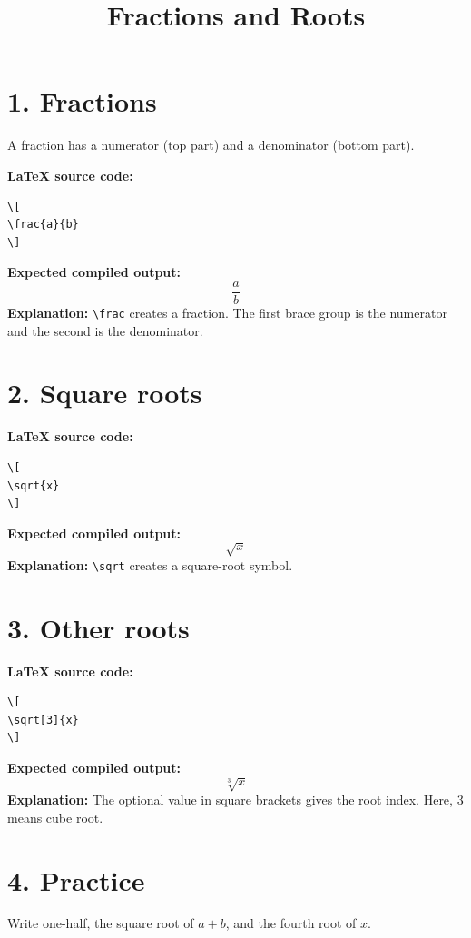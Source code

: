 \documentclass{article}
\title{Fractions and Roots}
\author{ }
\date{}
\begin{document}
\maketitle

\section*{1. Fractions}
A fraction has a numerator (top part) and a denominator (bottom part).

\textbf{LaTeX source code:}
\begin{verbatim}
\[
\frac{a}{b}
\]
\end{verbatim}
\textbf{Expected compiled output:}
\[
\frac{a}{b}
\]
\textbf{Explanation:} \verb|\frac| creates a fraction. The first brace group is the numerator and the second is the denominator.

\section*{2. Square roots}
\textbf{LaTeX source code:}
\begin{verbatim}
\[
\sqrt{x}
\]
\end{verbatim}
\textbf{Expected compiled output:}
\[
\sqrt{x}
\]
\textbf{Explanation:} \verb|\sqrt| creates a square-root symbol.

\section*{3. Other roots}
\textbf{LaTeX source code:}
\begin{verbatim}
\[
\sqrt[3]{x}
\]
\end{verbatim}
\textbf{Expected compiled output:}
\[
\sqrt[3]{x}
\]
\textbf{Explanation:} The optional value in square brackets gives the root index. Here, 3 means cube root.

\section*{4. Practice}
Write one-half, the square root of \(a+b\), and the fourth root of \(x\).
\end{document}
